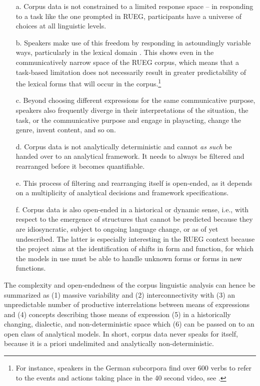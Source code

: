\documentclass[output=paper,colorlinks,citecolor=brown]{langscibook}
\begin{document}
\begin{enumerate}
    \item[a.] Corpus data is not constrained to a limited response space -- in responding to a task like the one prompted in RUEG, participants have a universe of choices at all linguistic levels.
    \item[b.] Speakers make use of this freedom by responding in  astoundingly variable ways, particularly in the lexical domain \parencite{shadrova2024LexDiv}. This shows even in the communicatively narrow space of the RUEG corpus, which means that a task-based limitation does not necessarily result in greater predictability of the lexical forms that will occur in the corpus.\footnote{For instance, speakers in the German subcorpora find over 600 verbs to refer to the events and actions taking place in the 40 second video, see \cite{shadrovaEtAlComplexVerbsRueg}.}
    \item[c.] Beyond choosing different expressions for the same communicative purpose, speakers also frequently diverge in their interpretations of the situation, the task, or the communicative purpose and engage in playacting, change the genre, invent content, and so on.
    \item[d.] Corpus data is not analytically deterministic and cannot \textit{as such} be handed over to an analytical framework. It needs to always be filtered and rearranged before it becomes quantifiable.
    \item[e.] This process of filtering and rearranging itself is open-ended, as it depends on a multiplicity of analytical decisions and framework specifications.
    \item[f.] Corpus data is also open-ended in a historical or dynamic sense, i.e., with respect to the emergence of structures that cannot be predicted because they are idiosyncratic, subject to ongoing language change, or as of yet undescribed. The latter is especially interesting in the RUEG context because the project aims at the identification of shifts in form and function, for which the models in use must be able to  handle unknown forms or forms in new functions.
\end{enumerate}

\begin{sloppypar}
The complexity and open-endedness of the corpus linguistic analysis can hence be summarized as (1) massive variability and (2) interconnectivity with (3) an unpredictable number of productive interrelations between means of expressions and (4) concepts describing those means of expression (5) in a historically changing, dialectic, and non-deterministic space which (6) can be passed on to an open class of analytical models. In short, corpus data never speaks for itself, because it is a priori undelimited and analytically non-deterministic.
\end{sloppypar}
\end{document}
